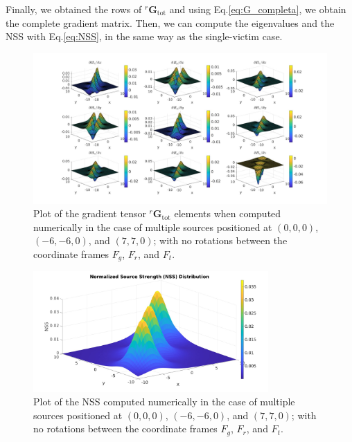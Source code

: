\noindent
Finally, we obtained the rows of ${}^r \mathbf{G}_{\text{tot}}$ and using Eq.\ref{eq:G_completa}, 
we obtain the complete gradient matrix. Then, we can compute the eigenvalues and the NSS
with Eq.\ref{eq:NSS}, in the same way as the single-victim case.

\begin{figure}
\hspace*{-0.2\textwidth}
\includegraphics[width=1.4\textwidth]{images/gradients_multi_num.jpg}
\caption{Plot of the gradient tensor ${}^r \mathbf{G}_{\text{tot}}$ elements
when computed numerically in the case of multiple sources positioned at  $(0,0,0)$, $(-6,-6,0)$, and $(7,7,0)$; with no rotations 
between the coordinate frames \( F_g \), \( F_r \), and \( F_t \).}
\label{fig:gradients_multi_num}
\end{figure}

\begin{figure}
\centering
\includegraphics[width=0.8\textwidth]{images/NSS_multi_num.jpg}
\caption{Plot of the NSS computed numerically in the case of multiple sources positioned at  $(0,0,0)$, $(-6,-6,0)$, and $(7,7,0)$; with no rotations 
between the coordinate frames \( F_g \), \( F_r \), and \( F_t \).}
\label{fig:NSS_multi_num}
\end{figure}

